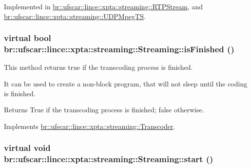 Implemented in \hyperlink{classbr_1_1ufscar_1_1lince_1_1xpta_1_1streaming_1_1RTPStream_ae4bab4f526f60b671a2baa9bfeae0189}{br::ufscar::lince::xpta::streaming::RTPStream}, and \hyperlink{classbr_1_1ufscar_1_1lince_1_1xpta_1_1streaming_1_1UDPMpegTS_aee9409fecaba631e3b20358ad4b301fe}{br::ufscar::lince::xpta::streaming::UDPMpegTS}.

\hypertarget{classbr_1_1ufscar_1_1lince_1_1xpta_1_1streaming_1_1Streaming_a4f3f9a288774205347994431946b5b86}{
\subsubsection[{isFinished}]{\setlength{\rightskip}{0pt plus 5cm}virtual bool br::ufscar::lince::xpta::streaming::Streaming::isFinished ()}}
\label{classbr_1_1ufscar_1_1lince_1_1xpta_1_1streaming_1_1Streaming_a4f3f9a288774205347994431946b5b86}


This method returns true if the transcoding process is finished. 

It can be used to create a non-\/block program, that will not sleep until the coding is finished. \begin{DoxyReturn}{Returns}
True if the transcoding process is finished; false otherwise. 
\end{DoxyReturn}


Implements \hyperlink{classbr_1_1ufscar_1_1lince_1_1xpta_1_1streaming_1_1Transcoder_aceabe1e9bb931313d5a52a53b9ab4af6}{br::ufscar::lince::xpta::streaming::Transcoder}.

\hypertarget{classbr_1_1ufscar_1_1lince_1_1xpta_1_1streaming_1_1Streaming_ae8498ac9f6d5efce8eda3fcfaebe2d5f}{
\subsubsection[{start}]{\setlength{\rightskip}{0pt plus 5cm}virtual void br::ufscar::lince::xpta::streaming::Streaming::start ()}}
\label{classbr_1_1ufscar_1_1lince_1_1xpta_1_1streaming_1_1Streaming_ae8498ac9f6d5efce8eda3fcfaebe2d5f}


